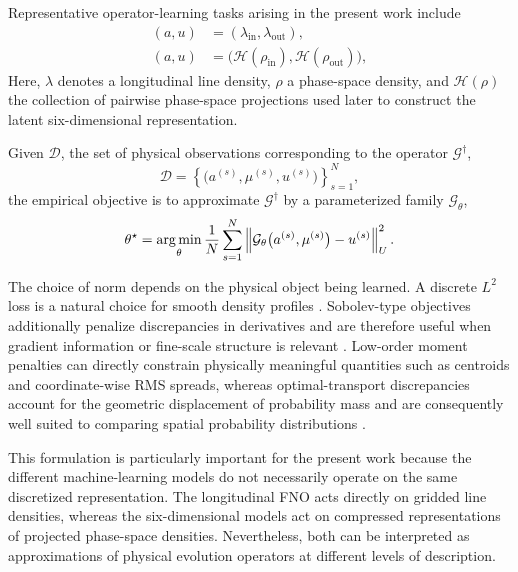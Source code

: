 Representative operator-learning tasks arising in the present work include
\begin{align}
(a,u)
&=
(\lambda_{\mathrm{in}},\lambda_{\mathrm{out}}),
\label{eq:operator_task_density}
\\
(a,u)
&=
\bigl(
\mathcal{H}(\rho_{\mathrm{in}}),
\mathcal{H}(\rho_{\mathrm{out}})
\bigr),
\label{eq:operator_task_histograms}
\end{align}
Here, $\lambda$ denotes a longitudinal line density, $\rho$ a phase-space density, and $\mathcal{H}(\rho)$ the collection of pairwise phase-space projections used later to construct the latent six-dimensional representation.

Given $\mathcal{D}$, the set of physical observations corresponding to the operator $\mathcal{G}^{\dagger}$,
\begin{equation}
\mathcal{D} =\left\{\bigl(a^{(s)},\mu^{(s)},u^{(s)}\bigr)\right\}_{s=1}^{N},
\end{equation}
the empirical objective is to approximate
$\mathcal{G}^{\dagger}$ by a parameterized family
$\mathcal{G}_{\theta}$,
\begin{equation}
\theta^{\star}
=
\operatorname*{arg\,min}_{\theta}
\frac{1}{N}
\sum_{s=1}^{N}
\left\lVert
\mathcal{G}_{\theta}
\bigl(a^{(s)},\mu^{(s)}\bigr)
-
u^{(s)}
\right\rVert_{U}^{2}.
\label{eq:operator_training_revised}
\end{equation}

The choice of norm depends on the physical object being learned. A discrete \(L^{2}\) loss is a natural choice for smooth density profiles \cite{kovachki_neural_operator_2023}. Sobolev-type objectives additionally penalize discrepancies in derivatives and are therefore useful when gradient information or fine-scale structure is relevant \cite{czarnecki_sobolev_2017}. Low-order moment penalties can directly constrain physically meaningful quantities such as centroids and coordinate-wise RMS spreads, whereas optimal-transport discrepancies account for the geometric displacement of probability mass and are consequently well suited to comparing spatial probability distributions \cite{peyre_computational_2019}.

This formulation is particularly important for the present work because the different machine-learning models do not necessarily operate on the same discretized representation. The longitudinal FNO acts directly on gridded line densities, whereas the six-dimensional models act on compressed representations of projected phase-space densities. Nevertheless, both can be interpreted as approximations of physical evolution operators at different levels of description.

